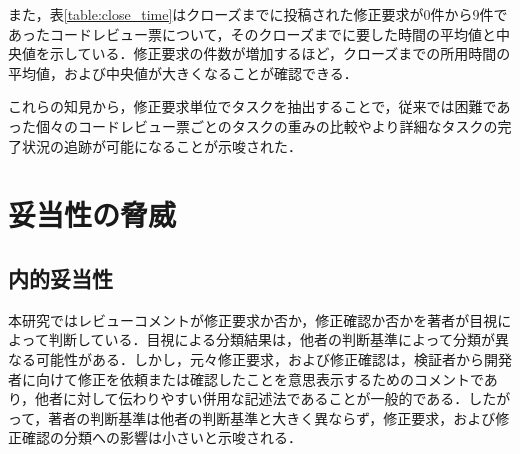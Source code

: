 \documentclass[11pt]{jreport}
\begin{document}
また，表\ref{table:close_time}はクローズまでに投稿された修正要求が0件から9件であったコードレビュー票について，そのクローズまでに要した時間の平均値と中央値を示している．修正要求の件数が増加するほど，クローズまでの所用時間の平均値，および中央値が大きくなることが確認できる．

これらの知見から，修正要求単位でタスクを抽出することで，従来では困難であった個々のコードレビュー票ごとのタスクの重みの比較やより詳細なタスクの完了状況の追跡が可能になることが示唆された．

\begin{table}[t]
\centering
  \caption{修正要求の件数ごとのコードレビュー票のクローズ時間}
  \label{table:close_time}
\end{table}

\section{妥当性の脅威}
\subsection{内的妥当性}
本研究ではレビューコメントが修正要求か否か，修正確認か否かを著者が目視によって判断している．目視による分類結果は，他者の判断基準によって分類が異なる可能性がある．しかし，元々修正要求，および修正確認は，検証者から開発者に向けて修正を依頼または確認したことを意思表示するためのコメントであり，他者に対して伝わりやすい併用な記述法であることが一般的である．したがって，著者の判断基準は他者の判断基準と大きく異ならず，修正要求，および修正確認の分類への影響は小さいと示唆される．
\end{document}
